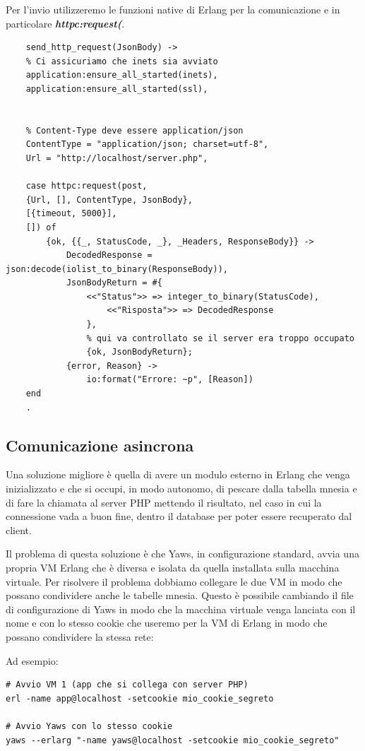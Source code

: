  Per l'invio utilizzeremo le funzioni native di Erlang per la comunicazione e in particolare \textbf{\textit{httpc:request(}}.

\begin{verbatim}
	send_http_request(JsonBody) ->
	% Ci assicuriamo che inets sia avviato
	application:ensure_all_started(inets),
	application:ensure_all_started(ssl),
	
	
	% Content-Type deve essere application/json
	ContentType = "application/json; charset=utf-8",
	Url = "http://localhost/server.php",
	
	case httpc:request(post,
	{Url, [], ContentType, JsonBody},
	[{timeout, 5000}],
	[]) of
		{ok, {{_, StatusCode, _}, _Headers, ResponseBody}} ->
			DecodedResponse = json:decode(iolist_to_binary(ResponseBody)),
			JsonBodyReturn = #{
				<<"Status">> => integer_to_binary(StatusCode),
					<<"Risposta">> => DecodedResponse
				},
				% qui va controllato se il server era troppo occupato
				{ok, JsonBodyReturn};
			{error, Reason} ->
				io:format("Errore: ~p", [Reason])
	end
	.		
\end{verbatim} 

\subsection{Comunicazione asincrona}
Una soluzione migliore \`e quella di avere un modulo esterno in Erlang che venga inizializzato e che si occupi, in modo autonomo, di pescare dalla tabella mnesia e di fare la chiamata al server PHP mettendo il risultato, nel caso in cui la connessione vada a buon fine, dentro il database per poter essere recuperato dal client.

Il problema di questa soluzione \`e che Yaws, in configurazione standard, avvia una propria VM Erlang che \`e diversa e isolata da quella installata sulla macchina virtuale.
Per risolvere il problema dobbiamo collegare le due VM in modo che possano condividere anche le tabelle mnesia.
Questo \`e possibile cambiando il file di configurazione di Yaws in modo che la macchina virtuale venga lanciata con il nome e con lo stesso cookie che useremo per la VM di Erlang in modo che possano condividere la stessa rete:

Ad esempio:
\begin{verbatim}
# Avvio VM 1 (app che si collega con server PHP)
erl -name app@localhost -setcookie mio_cookie_segreto

# Avvio Yaws con lo stesso cookie
yaws --erlarg "-name yaws@localhost -setcookie mio_cookie_segreto"
\end{verbatim}

